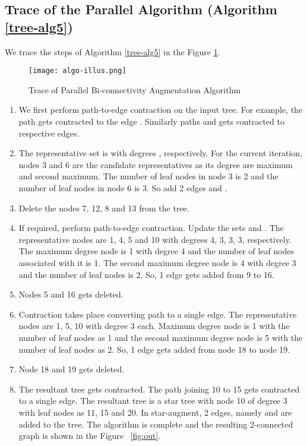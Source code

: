 \documentclass[runningheads]{llncs}
\begin{document}
\subsection{Trace of the Parallel Algorithm (Algorithm \ref{tree-alg5})}
We trace the steps of  Algorithm \ref{tree-alg5} in the Figure \ref{fig:trace}. 
\begin{figure}[htpb]
\begin{center}
\texttt{[image: algo-illus.png]}
\caption {Trace of Parallel Bi-connectivity Augmentation Algorithm}   \label{fig:trace}
\end{center}
\end{figure}
\begin{enumerate}
\item We first perform path-to-edge contraction on the input tree.  For example, the path  gets contracted to the edge . Similarly paths  and  gets contracted to respective edges.
\item The representative set is  with degrees , respectively.  For the current iteration, nodes 3 and 6 are the candidate representatives as its degree are maximum and second maximum.  The number of leaf nodes in node 3 is 2 and the number of leaf nodes in node 6 is 3.  So add 2 edges  and  .
\item Delete the nodes 7, 12, 8 and 13 from the tree.
\item If required, perform path-to-edge contraction.  Update the sets  and .  The representative nodes are 1, 4, 5 and 10 with degrees 4, 3, 3, 3, respectively.  The maximum degree node is 1 with degree 4 and the number of leaf nodes associated with it is 1.  The second maximum degree node is 4 with degree 3 and the number of leaf nodes is 2. So, 1 edge gets added from 9 to 16.
\item Nodes 5 and 16 gets deleted.
\item Contraction takes place converting path to a single edge.  The representative nodes are 1, 5, 10 with degree 3 each.  Maximum degree node is 1 with the number of leaf nodes as 1 and the second maximum degree node is 5 with the number of leaf nodes as 2. So, 1 edge gets added from node 18 to node 19.
\item Node 18 and 19 gets deleted.
\item The resultant tree gets contracted. The path joining 10 to 15 gets contracted to a single edge. The resultant tree is a star tree with node 10 of degree 3 with leaf nodes as 11, 15 and 20.  In star-augment, 2 edges, namely  and  are added to the tree.  The algorithm is complete and the resulting 2-connected graph is shown in the  Figure ~\ref{fig:out}. 
\end{enumerate}
\end{document}
